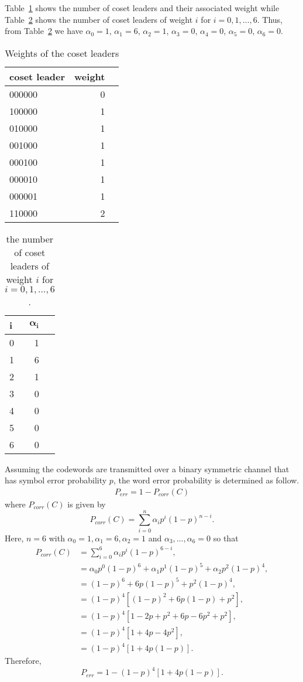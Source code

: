 Table~\ref{tab:10} shows the number of coset leaders and their associated weight while Table~\ref{tab:11} shows the number of coset leaders of weight $i$ for $i=0,1,\ldots,6$. Thus, from Table~\ref{tab:11} we have $\alpha_0=1$, $\alpha_1=6$, $\alpha_2=1$, $\alpha_3=0$, $\alpha_4=0$, $\alpha_5=0$, $\alpha_6=0$. 
\begin{table}[!htp]\centering
\begin{tabular}{lrr}\toprule
\textbf{coset leader} &\textbf{weight} \\\midrule
000000 &0 \\
100000 &1 \\
010000 &1 \\
001000 &1 \\
000100 &1 \\
000010 &1 \\
000001 &1 \\
110000 &2 \\
\bottomrule
\end{tabular}
\caption{Weights of the coset leaders}\label{tab:10}
\end{table}

\begin{table}[!htp]\centering
\begin{tabular}{lrr}\toprule
\textbf{i} &$\bm{\alpha_i}$ \\\midrule
0 &1 \\
1 &6 \\
2 &1 \\
3 &0 \\
4 &0 \\
5 &0 \\
6 &0 \\
\bottomrule
\end{tabular}
\caption{the number of coset leaders of weight $i$ for
$i = 0, 1,\ldots, 6$.}\label{tab:11}
\end{table}
Assuming the codewords are transmitted over a binary symmetric channel that has symbol error probability $p$, the word error probability is determined as follow.
\begin{align*}
	P_{err} = 1 - P_{corr}(C)
\end{align*}
where $P_{corr}(C)$ is given by
\[
	P_{corr}(C) = \sum_{i=0}^n\alpha_i p^i(1-p)^{n-i}.
\]
Here, $n=6$ with $\alpha_0=1, \alpha_1=6, \alpha_2=1$ and $\alpha_3,\ldots,\alpha_6=0$ so that
\begin{align*}
	P_{corr}(C) &= \sum_{i=0}^6\alpha_i p^i(1-p)^{6-i},\\
	&=\alpha_0 p^0(1-p)^6 + \alpha_1 p^1(1-p)^5 + \alpha_2 p^2(1-p)^4,\\
	&=(1-p)^6 + 6 p(1-p)^5 + p^2(1-p)^4,\\
	&=(1-p)^4\left[(1-p)^2 + 6 p(1-p) + p^2\right],\\
	&=(1-p)^4\left[1-2p + p^2 + 6 p-6p^2 + p^2\right],\\
	&=(1-p)^4\left[1+4p-4p^2\right],\\
	&=(1-p)^4\left[1+4p(1-p)\right].
\end{align*}
Therefore,
\[
	P_{err} = 1 - (1-p)^4\left[1+4p(1-p)\right].
\]
\clearpage
